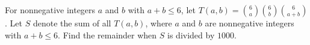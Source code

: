 For nonnegative integers $a$ and $b$ with  $a + b \leq 6$,  let $T(a, b) = \binom{6}{a} \binom{6}{b} \binom{6}{a + b}$. Let $S$ denote the sum of all $T(a, b)$,  where $a$ and $b$ are nonnegative integers with $a + b \leq 6$. Find the remainder when $S$ is divided by $1000$.